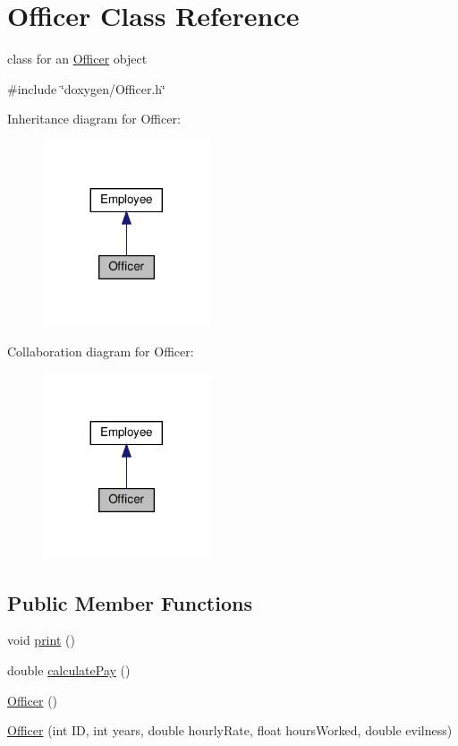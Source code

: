 \hypertarget{classOfficer}{}\section{Officer Class Reference}
\label{classOfficer}


class for an \hyperlink{classOfficer}{Officer} object  




{\ttfamily \#include \char`\"{}doxygen/\+Officer.\+h\char`\"{}}



Inheritance diagram for Officer\+:\nopagebreak
\begin{figure}[H]
\begin{center}
\leavevmode
\includegraphics[width=140pt]{classOfficer__inherit__graph}
\end{center}
\end{figure}


Collaboration diagram for Officer\+:\nopagebreak
\begin{figure}[H]
\begin{center}
\leavevmode
\includegraphics[width=140pt]{classOfficer__coll__graph}
\end{center}
\end{figure}
\subsection*{Public Member Functions}
\begin{DoxyCompactItemize}
\item 
void \hyperlink{classOfficer_aeadece05a1a0b7fb29bd412830d2e07a}{print} ()
\item 
double \hyperlink{classOfficer_a1fa1aad39b9e95be7a088990ebf17059}{calculate\+Pay} ()
\item 
\hyperlink{classOfficer_a80ac1e36a3f36c3a7e12b5dc9320ad89}{Officer} ()
\item 
\hyperlink{classOfficer_ac75c45d6e8628606278cb4ce6596f67f}{Officer} (int ID, int years, double hourly\+Rate, float hours\+Worked, double evilness)
\end{DoxyCompactItemize}
